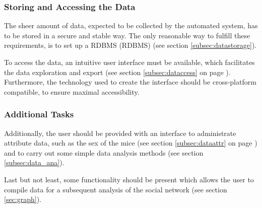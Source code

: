 \subsubsection{Storing and Accessing the Data}
\label{subsubsec:storeaccess}
The sheer amount of data, expected to be collected by the automated system, has to be stored in a secure and stable way. The only reasonable way to fulfill these requirements, is to set up a \ac{RDBMS} (RDBMS) (see section \ref{subsec:datastorage}). 

To access the data, an intuitive user interface must be available, which facilitates the data exploration and export (see section \ref{subsec:dataccess} on page \pageref{subsec:dataccess}). Furthermore, the technology used to create the interface should be cross-platform compatible, to ensure maximal accessibility.

\subsubsection{Additional Tasks}
\label{subsubsec:additional}
Additionally, the user should be provided with an interface to administrate attribute data, such as the sex of the mice (see section \ref{subsec:dataattr} on page \pageref{subsec:dataattr}) and to carry out some simple data analysis methods (see section \ref{subsec:data_ana}).

Last but not least, some functionality should be present which allows the user to compile data for a subsequent analysis of the social network (see section \ref{sec:graph}).